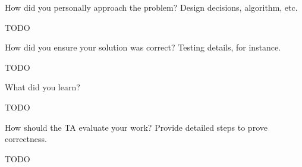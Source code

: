 \documentclass{article}
\newenvironment{question}[2][Question]{\begin{trivlist}
\item[\hskip \labelsep {\bfseries #1}\hskip \labelsep {\bfseries #2.}]}{\end{trivlist}}
\begin{document}
\begin{question}{2}
How did you personally approach the problem? Design decisions, algorithm, etc.\end{question}
TODO


\vspace{0.25in} %

\begin{question}{3}
How did you ensure your solution was correct? Testing details, for instance.
\end{question}
TODO


\vspace{0.25in}
\begin{question}{4}
What did you learn?
\end{question}
TODO


\vspace{0.25in}
\begin{question}{4}
How should the TA evaluate your work? Provide detailed steps to prove correctness.
\end{question}
TODO

\end{document}
